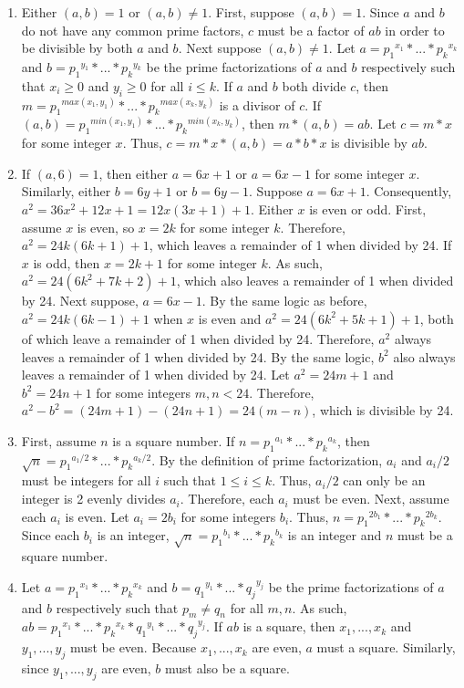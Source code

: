 \documentclass{article}
\begin{document}
\begin{enumerate}
\item Either $(a,b) = 1$ or $(a, b) \neq 1$.  First, suppose $(a, b) = 1$.  Since $a$ and $b$ do not have any common prime factors, $c$ must be a factor of $ab$ in order to be divisible by both $a$ and $b$.  Next suppose $(a, b) \neq 1$.  Let $a = {p_1}^{x_1} * ... * {p_k}^{x_k}$ and $b = {p_1}^{y_1} * ... * {p_k}^{y_k}$ be the prime factorizations of $a$ and $b$ respectively such that $x_i \geq 0$ and $y_i \geq 0$ for all $i \leq k$.  If $a$ and $b$ both divide $c$, then $m = {p_1}^{max(x_1, y_1)} * ... * {p_k}^{max(x_k, y_k)}$ is a divisor of $c$.  If $(a,b) = {p_1}^{min(x_1, y_1)} * ... * {p_k}^{min(x_k, y_k)}$, then  $m * (a,b) = ab$.  Let $c = m*x$ for some integer $x$.  Thus, $c = m*x*(a,b) = a*b*x$ is divisible by $ab$.

\item If $(a, 6) = 1$, then either $a = 6x + 1$ or $a = 6x - 1$ for some integer $x$.  Similarly, either $b = 6y + 1$ or $b = 6y - 1$.  Suppose $a = 6x + 1$.  Consequently, $a^2 = 36x^2 + 12x + 1 = 12x(3x + 1) + 1$.  Either $x$ is even or odd.  First, assume $x$ is even, so $x = 2k$ for some integer $k$.  Therefore, $a^2 = 24k(6k+1) + 1$, which leaves a remainder of 1 when divided by 24.  If $x$ is odd, then $x = 2k+1$ for some integer $k$.  As such, $a^2 = 24(6k^2 + 7k + 2) + 1$, which also leaves a remainder of 1 when divided by 24.  Next suppose, $a = 6x - 1$.  By the same logic as before, $a^2 = 24k(6k - 1) + 1$ when $x$ is even and $a^2 = 24(6k^2 + 5k +1) + 1$, both of which leave a remainder of 1 when divided by 24.  Therefore, $a^2$ always leaves a remainder of 1 when divided by 24.  By the same logic, $b^2$ also always leaves a remainder of 1 when divided by 24.  Let $a^2 = 24m + 1$ and $b^2 = 24n + 1$ for some integers $m, n < 24$.  Therefore, $a^2 - b^2 = (24m + 1) - (24n + 1) = 24(m-n)$, which is divisible by 24.

\item First, assume $n$ is a square number.  If $n = {p_1}^{a_1} * ... * {p_k}^{a_k}$, then $\sqrt n = {p_1}^{a_1/2} * ... * {p_k}^{a_k/2}$.  By the definition of prime factorization, $a_i$ and $a_i/2$ must be integers for all $i$ such that $1 \leq i \leq k$.  Thus, $a_i/2$ can only be an integer is 2 evenly divides $a_i$.  Therefore, each $a_i$ must be even.  Next, assume each $a_i$ is even.  Let $a_i = 2b_i$ for some integers $b_i$.  Thus, $n = {p_1}^{2b_1} * ... * {p_k}^{2b_k}$.  Since each $b_i$ is an integer, $\sqrt n = {p_1}^{b_1} * ... * {p_k}^{b_k}$ is an integer and $n$ must be a square number.

\item Let $a = {p_1}^{x_1} * ... * {p_k}^{x_k}$ and $b = {q_1}^{y_1} * ... * {q_j}^{y_j}$ be the prime factorizations of $a$ and $b$ respectively such that $p_m \neq q_n$ for all $m, n$.  As such, $ab = {p_1}^{x_1} * ... * {p_k}^{x_k} * {q_1}^{y_1} * ... * {q_j}^{y_j}$.  If $ab$ is a square, then $x_1, ..., x_k$ and $y_1, ..., y_j$ must be even.  Because $x_1, ..., x_k$ are even, $a$ must a square.  Similarly, since $y_1, ..., y_j$ are even, $b$ must also be a square.

\end{enumerate}
\end{document}
